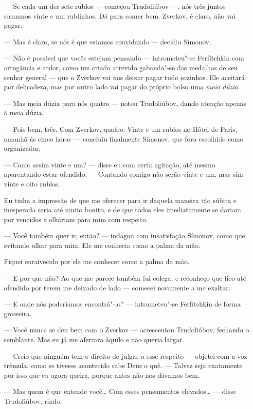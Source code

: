 --- Se cada um der sete rublos --- começou Trudoliúbov ---, nós três juntos
somamos vinte e um rublinhos. Dá para comer bem. Zverkov, é claro, não
vai pagar.

--- Mas é claro, se nós é que estamos convidando --- decidiu Símonov.

--- Não é possível que vocês estejam pensando --- intrometeu"-se Ferfítchkin
com arrogância e ardor, como um criado atrevido gabando"-se das medalhas
de seu senhor general --- que o Zverkov vai nos deixar pagar tudo
sozinhos. Ele aceitará por delicadeza, mas por outro lado vai pagar do
próprio bolso uma \textit{meia dúzia}.

--- Mas meia dúzia para nós quatro --- notou Trudoliúbov, dando atenção
apenas à meia dúzia.

--- Pois bem, três. Com Zverkov, quatro. Vinte e um rublos no
Hôtel de Paris, amanhã às cinco horas --- concluiu
finalmente Símonov, que fora escolhido como organizador.

--- Como assim vinte e um? --- disse eu com certa agitação, até mesmo
aparentando estar ofendido. --- Contando comigo não serão vinte e um, mas
sim vinte e oito rublos.


Eu tinha a impressão de que me oferecer para ir daquela maneira tão
súbita e inesperada seria até muito bonito, e de que todos eles
imediatamente se dariam por vencidos e olhariam para mim com respeito.

--- Você também quer ir, então? --- indagou com insatisfação Símonov, como
que evitando olhar para mim. Ele me conhecia como a palma da mão.

Fiquei enraivecido por ele me conhecer como a palma da mão.

--- E por que não? Ao que me parece também fui colega, e reconheço que
fico até ofendido por terem me deixado de lado --- comecei novamente a
me exaltar.

--- E onde nós poderíamos encontrá"-lo? --- intrometeu"-se Ferfítchkin de
forma grosseira.

--- Você nunca se deu bem com o Zverkov --- acrescentou Trudoliúbov,
fechando o semblante. Mas eu já me aferrara àquilo e não queria largar.

--- Creio que ninguém tem o direito de julgar a esse respeito --- objetei
com a voz trêmula, como se tivesse acontecido sabe Deus o quê. --- Talvez
seja exatamente por isso que eu agora queira, porque antes não nos
dávamos bem.

--- Mas quem é que entende você\ldots{} Com esses pensamentos elevados\ldots{} ---
disse Trudoliúbov, rindo.

